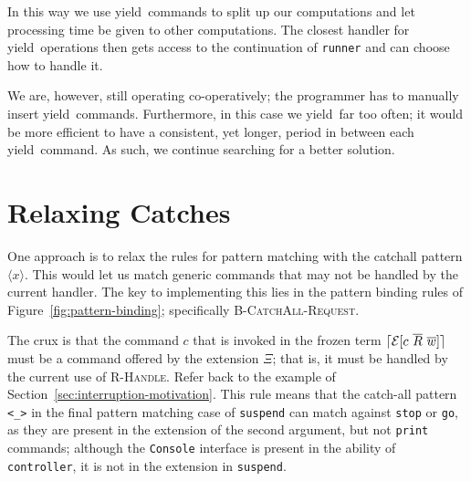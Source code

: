 \documentclass[msc,deptreport,cs]{infthesis} %
\newcommand{\code}[1]{\lstinline{#1}}
\newcommand\yield{\textsf{yield}\xspace}
\DeclarePairedDelimiter{\ceil}{\lceil}{\rceil}
\newcommand{\many}{\overline}
\newcommand{\adj}{\Delta}
\newcommand{\adapt}{\Theta}
\newcommand{\ext}{\Xi}
\newcommand{\sig}{I}
\newcommand{\effin}[1]{\langle {#1} \rangle}
\newcommand{\EC}{\mathcal{E}}
\newcommand{\freeze}{\ceil}
\newcommand{\pipe}{\texttt{|}}
\begin{document}
In this way we use \yield~commands to split up our computations and let
processing time be given to other computations. The closest handler for
\yield~operations then gets access to the continuation of \code{runner} and can
choose how to handle it.

We are, however, still operating co-operatively; the programmer has to manually
insert \yield~commands. Furthermore, in this case we \yield~far too often; it would be more efficient to have a consistent, yet longer, period in between each \yield~command.
%
As such, we continue searching for a better solution.

\section{Relaxing Catches}
\label{sec:relaxing-catches}

One approach is to relax the rules for pattern matching with the catchall
pattern $\effin{x}$. This would let us match generic commands that may not be
handled by the current handler. The key to implementing this lies in the pattern
binding rules of Figure~\ref{fig:pattern-binding}; specifically
\textsc{B-CatchAll-Request}.

%

The crux is that the command $c$ that is invoked in the frozen term
$\freeze{\EC[c~\many{R}~\many{w}]}$ must be a command offered by the extension
$\ext$; that is, it must be handled by the current use of \textsc{R-Handle}.
Refer back to the example of Section~\ref{sec:interruption-motivation}. This
rule means that the catch-all pattern \code{<_>} in the final pattern matching
case of \code{suspend} can match against \code{stop} or \code{go}, as they are
present in the extension of the second argument, but not \code{print} commands;
although the \code{Console} interface is present in the ability of
\code{controller}, it is not in the extension in \code{suspend}.
\end{document}

